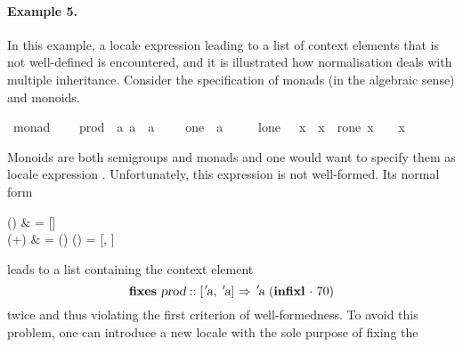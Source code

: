 \begin{isabellebody}
\begin{isamarkuptext}
\paragraph{Example 5.}
  In this example, a locale expression leading to a list of context
  elements that is not well-defined is encountered, and it is illustrated
  how normalisation deals with multiple inheritance.
  Consider the specification of monads (in the algebraic sense)
  and monoids.%
\end{isamarkuptext}%
\isamarkupfalse%
\ monad\ {\isacharequal}\isanewline
\ \ \ prod\ {\isacharcolon}{\isacharcolon}\ {\isachardoublequote}{\isacharbrackleft}{\isacharprime}a{\isacharcomma}\ {\isacharprime}a{\isacharbrackright}\ {\isasymRightarrow}\ {\isacharprime}a{\isachardoublequote}\ {\isacharparenleft}\ {\isachardoublequote}{\isasymcdot}{\isachardoublequote}\ {}{}{\isacharparenright}\ \ one\ {\isacharcolon}{\isacharcolon}\ {\isacharprime}a\ {\isacharparenleft}{\isachardoublequote}{\isasymone}{\isachardoublequote}\ {}{}{}{\isacharparenright}\isanewline
\ \ \ l{\isacharunderscore}one{\isacharcolon}\ {\isachardoublequote}{\isasymone}\ {\isasymcdot}\ x\ {\isacharequal}\ x{\isachardoublequote}\ \ r{\isacharunderscore}one{\isacharcolon}\ {\isachardoublequote}x\ {\isasymcdot}\ {\isasymone}\ {\isacharequal}\ x{\isachardoublequote}\isamarkuptrue%
%
\begin{isamarkuptext}%
Monoids are both semigroups and monads and one would want to
  specify them as locale expression .
  Unfortunately, this expression is not well-formed.  Its normal form
\begin{align*%
}
  \N() & = [] \\
  \N(+) & =
       \N() \App \N()
     = [, ]
\end{align*%
}
  leads to a list containing the context element
\[
  \textbf{fixes}~\isa{prod} :: \isa{{\isachardoublequote}{\isacharbrackleft}{\isacharprime}a{\isacharcomma}\ {\isacharprime}a{\isacharbrackright}\ {\isasymRightarrow}\ {\isacharprime}a{\isachardoublequote}}
    ~(\textbf{infixl}~\isa{{\isachardoublequote}{\isasymcdot}{\isachardoublequote}}~70)
\]
  twice and thus violating the first criterion of well-formedness.  To
  avoid this problem, one can
  introduce a new locale  with the sole purpose of fixing the

\end{isamarkuptext}
\end{isabellebody}
